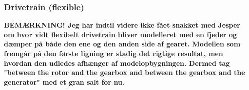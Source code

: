 %
%
%
%


\subsubsection{Drivetrain (flexible)}

\textbf{BEMÆRKNING! Jeg har indtil videre ikke fået snakket med Jesper om hvor vidt flexibelt drivetrain bliver modelleret med en fjeder og dæmper på både den ene og den anden side af gearet. Modellen som fremgår på den første ligning er stadig det rigtige resultat, men hvordan den udledes afhænger af modelopbygningen. Dermed tag "between the rotor and the gearbox and between the gearbox and the generator" med et gran salt for nu.}

